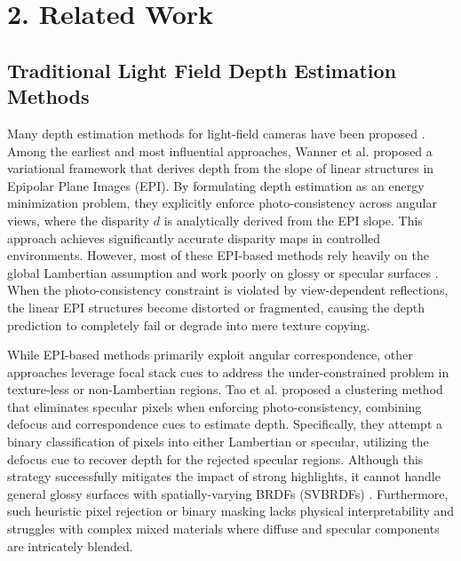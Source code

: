 \section{2. Related Work}

\subsection{Traditional Light Field Depth Estimation Methods}

Many depth estimation methods for light-field cameras have been proposed \cite{lightfielddepthestimationE}. Among the earliest and most influential approaches, Wanner et al. \cite{Wannergloballyconsistentdep} proposed a variational framework that derives depth from the slope of linear structures in Epipolar Plane Images (EPI). By formulating depth estimation as an energy minimization problem, they explicitly enforce photo-consistency across angular views, where the disparity $d$ is analytically derived from the EPI slope. This approach achieves significantly accurate disparity maps in controlled environments. However, most of these EPI-based methods rely heavily on the global Lambertian assumption and work poorly on glossy or specular surfaces \cite{Lambertianassumptionglossys}. When the photo-consistency constraint is violated by view-dependent reflections, the linear EPI structures become distorted or fragmented, causing the depth prediction to completely fail or degrade into mere texture copying.

While EPI-based methods primarily exploit angular correspondence, other approaches leverage focal stack cues to address the under-constrained problem in texture-less or non-Lambertian regions. Tao et al. \cite{Taodepthfromcombiningdefoc} proposed a clustering method that eliminates specular pixels when enforcing photo-consistency, combining defocus and correspondence cues to estimate depth. Specifically, they attempt a binary classification of pixels into either Lambertian or specular, utilizing the defocus cue to recover depth for the rejected specular regions. Although this strategy successfully mitigates the impact of strong highlights, it cannot handle general glossy surfaces with spatially-varying BRDFs (SVBRDFs) \cite{spatiallyvaryingBRDFsglossy}. Furthermore, such heuristic pixel rejection or binary masking lacks physical interpretability and struggles with complex mixed materials where diffuse and specular components are intricately blended.

